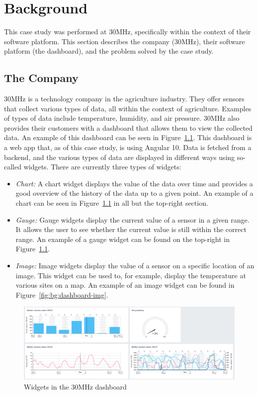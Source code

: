 \chapter{Background}\label{chap:background}

This case study was performed at 30MHz, specifically within the context of their software platform. This section describes the company (30MHz), their software platform (the dashboard), and the problem solved by the case study.

\section{The Company}\label{sec:bg:thecompany}
30MHz is a technology company in the agriculture industry. They offer sensors that collect various types of data, all within the context of agriculture. Examples of types of data include temperature, humidity, and air pressure. 30MHz also provides their customers with a dashboard that allows them to view the collected data. An example of this dashboard can be seen in Figure~\ref{fig:bg:dashboard}. This dashboard is a web app that, as of this case study, is using Angular 10. Data is fetched from a backend, and the various types of data are displayed in different ways using so-called widgets. There are currently three types of widgets:

\begin{itemize}
  \item \emph{Chart:} A chart widget displays the value of the data over time and provides a good overview of the history of the data up to a given point. An example of a chart can be seen in Figure~\ref{fig:bg:dashboard} in all but the top-right section.
  \item \emph{Gauge:} Gauge widgets display the current value of a sensor in a given range. It allows the user to see whether the current value is still within the correct range. An example of a gauge widget can be found on the top-right in Figure~\ref{fig:bg:dashboard}.
  \item \emph{Image:} Image widgets display the value of a sensor on a specific location of an image. This widget can be used to, for example, display the temperature at various sites on a map. An example of an image widget can be found in Figure~\ref{fig:bg:dashboard-img}.
\end{itemize}

\begin{figure}[htbp]
  \includegraphics[width=\columnwidth]{figures/background/dashboard.png}
  \caption{Widgets in the 30MHz dashboard}
  \label{fig:bg:dashboard}
  \centering
\end{figure}

